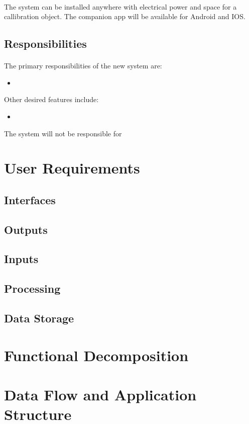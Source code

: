 \documentclass[12pt, letterpaper]{article}
\begin{document}
    \paragraph{}
    The system can be installed anywhere with electrical power and space for a callibration object. The companion app
    will be available for Android and IOS.
    \subsection{Responsibilities}
    \paragraph{}
    The primary responsibilities of the new system are:
    \begin{itemize}
        \item 
    \end{itemize}
    Other desired features include:
    \begin{itemize}
        \item 
    \end{itemize}
    The system will not be responsible for 
    \section{User Requirements}
    \subsection{Interfaces}
    \subsection{Outputs}
    \subsection{Inputs}
    \subsection{Processing}
    \subsection{Data Storage}
    \section{Functional Decomposition}
    \section{Data Flow and Application Structure}
\end{document}
